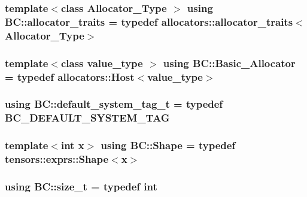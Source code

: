 \subsubsection[{\texorpdfstring{allocator\+\_\+traits}{allocator_traits}}]{\setlength{\rightskip}{0pt plus 5cm}template$<$class Allocator\+\_\+\+Type $>$ using {\bf B\+C\+::allocator\+\_\+traits} = typedef {\bf allocators\+::allocator\+\_\+traits}$<$Allocator\+\_\+\+Type$>$}\hypertarget{namespaceBC_a702bcffa3526460ac93fb2a315f2f7c7}{}\label{namespaceBC_a702bcffa3526460ac93fb2a315f2f7c7}
\subsubsection[{\texorpdfstring{Basic\+\_\+\+Allocator}{Basic_Allocator}}]{\setlength{\rightskip}{0pt plus 5cm}template$<$class value\+\_\+type $>$ using {\bf B\+C\+::\+Basic\+\_\+\+Allocator} = typedef {\bf allocators\+::\+Host}$<$value\+\_\+type$>$}\hypertarget{namespaceBC_a887e2503ef30c92b917feb4a80f92a69}{}\label{namespaceBC_a887e2503ef30c92b917feb4a80f92a69}
\subsubsection[{\texorpdfstring{default\+\_\+system\+\_\+tag\+\_\+t}{default_system_tag_t}}]{\setlength{\rightskip}{0pt plus 5cm}using {\bf B\+C\+::default\+\_\+system\+\_\+tag\+\_\+t} = typedef {\bf B\+C\+\_\+\+D\+E\+F\+A\+U\+L\+T\+\_\+\+S\+Y\+S\+T\+E\+M\+\_\+\+T\+AG}}\hypertarget{namespaceBC_abe6173b72b8ddcda096eac20d5110e72}{}\label{namespaceBC_abe6173b72b8ddcda096eac20d5110e72}
\subsubsection[{\texorpdfstring{Shape}{Shape}}]{\setlength{\rightskip}{0pt plus 5cm}template$<$int x$>$ using {\bf B\+C\+::\+Shape} = typedef {\bf tensors\+::exprs\+::\+Shape}$<$x$>$}\hypertarget{namespaceBC_adac665f44bd5de19df55f8681248310b}{}\label{namespaceBC_adac665f44bd5de19df55f8681248310b}
\subsubsection[{\texorpdfstring{size\+\_\+t}{size_t}}]{\setlength{\rightskip}{0pt plus 5cm}using {\bf B\+C\+::size\+\_\+t} = typedef int}\hypertarget{namespaceBC_a6007cbc4eeec401a037b558910a56173}{}\label{namespaceBC_a6007cbc4eeec401a037b558910a56173}
